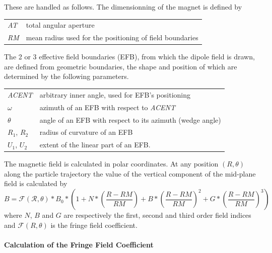 \bigskip

\noindent These are handled as follows. The dimensionning of the magnet is defined by

\bigskip

 \begin{tabular}{>{\sl}l!{:}l}
	 AT &  total angular aperture \\
	 RM & mean radius used for the positioning of field boundaries\\
 \end{tabular}

\bigskip

The 2 or 3 effective field boundaries (EFB), from which  the dipole field  is drawn, are
defined from geometric boundaries, the shape and position of which are determined by the 
following parameters. 

\bigskip

\begin{tabular}{l!{:}l}
	 \textsl{ACENT} 
	    & arbitrary inner angle, used for EFB's positioning  \\
	$\omega$ &  azimuth of an EFB with respect to  \textsl{ACENT}\\
	$\theta$ & angle of an EFB with respect to its azimuth (wedge angle)\\ 
	$R_1$, $R_2$  &  radius of curvature of an EFB\\
	$U_1$, $U_2$  &  extent of the linear part of an EFB. 
\end{tabular}

\bigskip


 \noindent The magnetic field is calculated in  polar
coordinates. At  any position $(R,\theta)$ along the  particle trajectory 
the value of the vertical component of the mid-plane field is calculated by 
 \begin{equation}
	 B =  \mathcal{F(R,\theta)} \ast  B_0 \ast  
	      \left(1+N \ast  
	           \left( \frac{R-RM }{ RM}\right) 
	           + B \ast  \left(\frac{R-RM }{ RM} \right)^2 
	           + G \ast  \left(\frac{R-RM }{ RM} \right)^3 
	      \right) 
 \end{equation}
 where  $ N$, $B $ and $ G $ are  respectively  the first, second and
third order field indices and $ \mathcal{F}(R,\theta)$ is the fringe field coefficient. 


\paragraph{Calculation of the Fringe Field Coefficient} 

